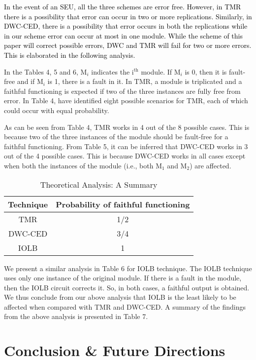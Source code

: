 \documentclass[10pt,journal,cspaper,compsoc]{IEEEtran}
\begin{document}
{{\textcolor{black} {In the event of an SEU, all the three schemes are error free. However, in TMR there is a possibility that error can occur in two or more replications. Similarly, in DWC-CED, there is a possibility that error occurs in both the replications while in our scheme error can occur at most in one module. While the scheme of this paper will correct possible errors, DWC and TMR will fail for two or more errors. This is elaborated in the following analysis.}

In the Tables 4, 5 and 6, M$_{i}$ indicates the i$\mathrm{^{th}}$ module. If M$_{i}$ is 0, then it is fault-free and if M$_{i}$ is 1, there is a fault in it. In TMR, a module is triplicated and a faithful functioning is expected if two of the three instances are fully free from error. In Table 4, have identified eight possible scenarios for TMR, each of which could occur with equal probability.

As can be seen from Table 4, TMR works in 4 out of the 8 possible cases. This is because two of the three instances of the module should be fault-free for a faithful functioning. From Table 5, it can be inferred that DWC-CED works in 3 out of the 4 possible cases. This is because DWC-CED works in all cases except when both the instances of the module (i.e., both M$\mathrm{_{1}}$ and M$\mathrm{_{2}}$) are affected.


\begin{table}[!t]
\caption{Theoretical Analysis: A Summary} \centering \begin{tabular}{|c| c|} \hline
Technique & Probability of faithful functioning  \\ [0.5ex] \hline TMR & 1/2 \\ DWC-CED & 3/4\\
IOLB & 1 \\ [1ex] \hline \end{tabular}
\label{table:nonlin} \end{table}

We present a similar analysis in Table 6 for IOLB technique. The IOLB technique uses only one instance of the original module. If there is a fault in the module, then the IOLB circuit corrects it. So, in both cases, a faithful output is obtained. We thus conclude from our above analysis that IOLB is the least likely to be affected when compared with TMR and DWC-CED. A summary of the findings from the above analysis is presented in Table 7.

\section{Conclusion \& Future Directions}\label{sec5}

}}
\end{document}
